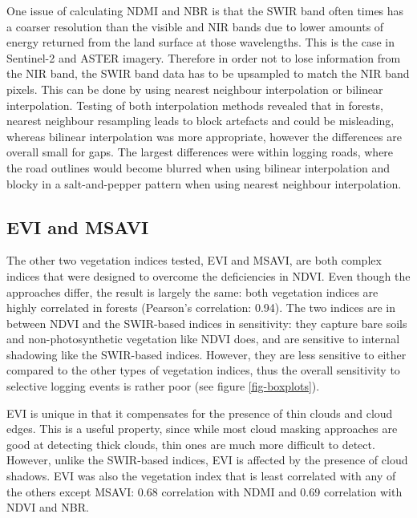 \documentclass[a4paper,12pt]{scrbook}
\begin{document}
One issue of calculating \ac{NDMI} and \ac{NBR} is that the \ac{SWIR} band often times has a coarser resolution than the visible and \ac{NIR} bands due to lower amounts of energy returned from the land surface at those wavelengths. This is the case in Sentinel-2 and \ac{ASTER} imagery. Therefore in order not to lose information from the \ac{NIR} band, the \ac{SWIR} band data has to be upsampled to match the \ac{NIR} band pixels. This can be done by using nearest neighbour interpolation or bilinear interpolation. Testing of both interpolation methods revealed that in forests, nearest neighbour resampling leads to block artefacts and could be misleading, whereas bilinear interpolation was more appropriate, however the differences are overall small for gaps. The largest differences were within logging roads, where the road outlines would become blurred when using bilinear interpolation and blocky in a salt-and-pepper pattern when using nearest neighbour interpolation.

\subsection{EVI and MSAVI}

The other two vegetation indices tested, \ac{EVI} and \ac{MSAVI}, are both complex indices that were designed to overcome the deficiencies in \ac{NDVI}. Even though the approaches differ, the result is largely the same: both vegetation indices are highly correlated in forests (Pearson's correlation: 0.94). The two indices are in between \ac{NDVI} and the \ac{SWIR}-based indices in sensitivity: they capture bare soils and non-photosynthetic vegetation like \ac{NDVI} does, and are sensitive to internal shadowing like the \ac{SWIR}-based indices. However, they are less sensitive to either compared to the other types of vegetation indices, thus the overall sensitivity to selective logging events is rather poor (see figure \ref{fig-boxplots}).

\ac{EVI} is unique in that it compensates for the presence of thin clouds and cloud edges. This is a useful property, since while most cloud masking approaches are good at detecting thick clouds, thin ones are much more difficult to detect. However, unlike the \ac{SWIR}-based indices, \ac{EVI} is affected by the presence of cloud shadows. \ac{EVI} was also the vegetation index that is least correlated with any of the others except \ac{MSAVI}: 0.68 correlation with \ac{NDMI} and 0.69 correlation with \ac{NDVI} and \ac{NBR}.
\end{document}
